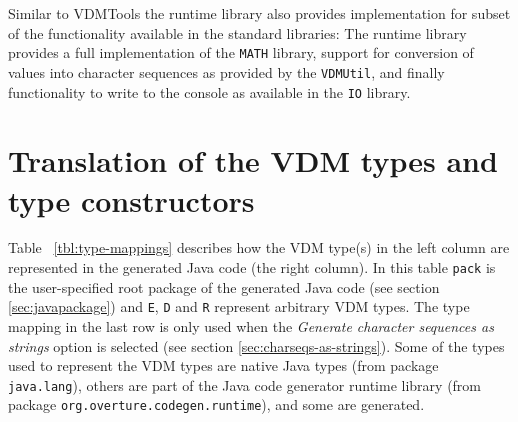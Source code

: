 Similar to VDMTools the runtime library also provides implementation
for subset of the functionality available in the standard libraries:
The runtime library provides a full implementation of the
\texttt{MATH} library, support for conversion of values into character
sequences as provided by the \texttt{VDMUtil}, and finally
functionality to write to the console as available in the \texttt{IO}
library.

\section{Translation of the VDM types and type constructors}
\label{sec:type-mappings}

Table ~\ref{tbl:type-mappings} describes how the VDM type(s) in the
left column are represented in the generated Java code (the right
column). In this table \texttt{pack} is the user-specified root
package of the generated Java code (see section \ref{sec:javapackage})
and \texttt{E}, \texttt{D} and \texttt{R} represent arbitrary VDM
types. The type mapping in the last row is only used when the
\emph{Generate character sequences as strings} option is selected (see
section \ref{sec:charseqs-as-strings}). Some of the types used to
represent the VDM types are native Java types (from package
\texttt{java.lang}), others are part of the Java code generator
runtime library (from package \texttt{org.overture.codegen.runtime}),
and some are generated.

